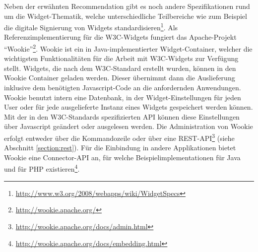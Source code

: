Neben der erwähnten Recommendation gibt es noch andere Spezifikationen rund um die Widget-Thematik, welche unterschiedliche Teilbereiche wie zum Beispiel die digitale Signierung von Widgets standardisieren\footnote{\url{http://www.w3.org/2008/webapps/wiki/WidgetSpecs}}. Als Referenzimplementierung für die W3C-Widgets fungiert das Apache-Projekt "`Wookie"'\footnote{\url{http://wookie.apache.org/}}. Wookie ist ein in Java-implementierter Widget-Container, welcher die wichtigsten Funktionalitäten für die Arbeit mit W3C-Widgets zur Verfügung stellt. Widgets, die nach dem W3C-Standard erstellt wurden, können in den Wookie Container geladen werden. Dieser übernimmt dann die Auslieferung inklusive dem benötigten Javascript-Code an die anfordernden Anwendungen. Wookie benutzt intern eine Datenbank, in der Widget-Einstellungen für jeden User oder für jede ausgelieferte Instanz eines Widgets gespeichert werden können. Mit der in den W3C-Standards spezifizierten API können diese Einstellungen über Javascript geändert oder ausgelesen werden. Die Administration von Wookie erfolgt entweder über die Kommandozeile oder über eine REST-API\footnote{\url{http://wookie.apache.org/docs/admin.html}} (siehe Abschnitt \ref{section:rest}). Für die Einbindung in andere Applikationen bietet Wookie eine Connector-API an, für welche Beispielimplementationen für Java und für PHP existieren\footnote{\url{http://wookie.apache.org/docs/embedding.html}}.

